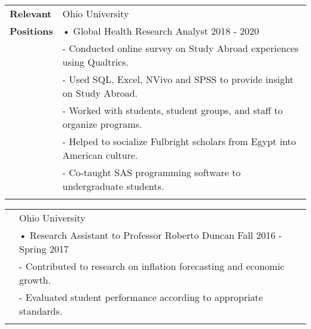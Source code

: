 \documentclass[final]{article}
\begin{document}

\begin{tabular}{@{} l l}
 \Large\textbf {Relevant}    &  \hspace{7ex} Ohio University\\
     \Large\textbf {Positions} & \hspace{7ex} • Global Health Research Analyst \hspace{28ex} 2018 - 2020\\
     & \hspace{10ex} - Conducted online survey on Study Abroad experiences using Qualtrics.\\
     & \hspace{10ex} - Used SQL, Excel, NVivo and SPSS to provide insight on Study Abroad. \\
     & \hspace{10ex} - Worked with students, student groups, and staff to organize programs. \\
     & \hspace{10ex} - Helped to socialize Fulbright scholars from Egypt into American culture. \\
     & \hspace{10ex} - Co-taught SAS programming software to undergraduate students. \\
     & \\
    \end{tabular}
    
    \begin{tabular}{@{} l l}
    & \hspace{23ex} Ohio University\\
    & \hspace{23ex} • Research Assistant to Professor Roberto Duncan \hspace{1ex} Fall 2016 - Spring 2017\\
    & \hspace{26ex} - Contributed to research on inflation forecasting and economic growth.\\
    & \hspace{26ex} - Evaluated student performance according to appropriate standards. \\
    & \\
    \end{tabular}

\end{document}
